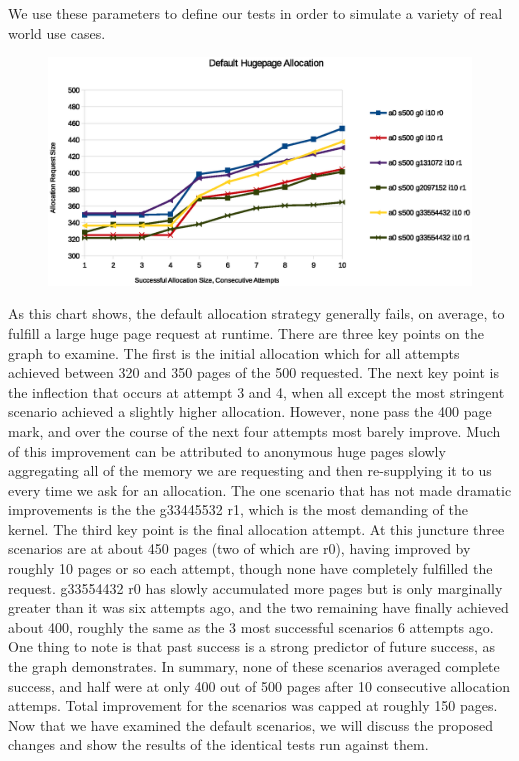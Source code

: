 \documentclass{article}
\begin{document}
We use these parameters to define our tests in order to simulate a variety of real world use cases. 
\begin{figure}[h!]
	\includegraphics[width=\linewidth]{./datums/default_alloc.eps}
	\label{fig:default_alloc}
\end{figure}

As this chart shows, the default allocation strategy generally fails, on average, to fulfill a large huge page request at runtime. There are three key points on the graph to examine. The first is the initial allocation which for all attempts achieved between 320 and 350 pages of the 500 requested. The next key point is the inflection that occurs at attempt 3 and 4, when all except the most stringent scenario achieved a slightly higher allocation. However, none pass the 400 page mark, and over the course of the next four attempts most barely improve. Much of this improvement can be attributed to anonymous huge pages slowly aggregating all of the memory we are requesting and then re-supplying it to us every time we ask for an allocation. The one scenario that has not made dramatic improvements is the the g33445532 r1, which is the most demanding of the kernel. The third key point is the final allocation attempt. At this juncture three scenarios are at about 450 pages (two of which are r0), having improved by roughly 10 pages or so each attempt, though none have completely fulfilled the request. g33554432 r0 has slowly accumulated more pages but is only marginally greater than it was six attempts ago, and the two remaining have finally achieved about 400, roughly the same as the 3 most successful scenarios 6 attempts ago. One thing to note is that past success is a strong predictor of future success, as the graph demonstrates. In summary, none of these scenarios averaged complete success, and half were at only 400 out of 500 pages after 10 consecutive allocation attemps. Total improvement for the scenarios was capped at roughly 150 pages. Now that we have examined the default scenarios, we will discuss the proposed changes and show the results of the identical tests run against them.
\end{document}
